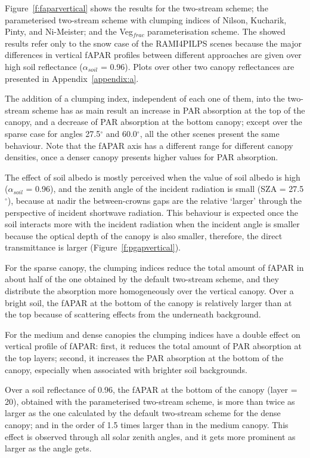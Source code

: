 Figure~\ref{f:faparvertical} shows the results for the two-stream scheme; the parameterised two-stream scheme with clumping indices of Nilson, Kucharik, Pinty, and Ni-Meister; and the Veg$_{frac}$ parameterisation scheme. The showed results refer only to the snow case of the RAMI4PILPS scenes because the major differences in vertical fAPAR profiles between different approaches are given over high soil reflectance ($\alpha_{soil}$ = 0.96). Plots over other two canopy reflectances are presented in Appendix~\ref{appendix:a}.

The addition of a clumping index, independent of each one of them, into the two-stream scheme has as main result an increase in PAR absorption at the top of the canopy, and a decrease of PAR absorption at the bottom canopy; except over the sparse case for angles 27.5$^{\circ}$ and 60.0$^{\circ}$, all the other scenes present the same behaviour. Note that the fAPAR axis has a different range for different canopy densities, once a denser canopy presents higher values for PAR absorption.

The effect of soil albedo is mostly perceived when the value of soil albedo is high ($\alpha_{soil}$ = 0.96), and the zenith angle of the incident radiation is small (SZA = 27.5$^{\circ}$), because at nadir the between-crowns gaps are the relative `larger' through the perspective of incident shortwave radiation. This behaviour is expected once the soil interacts more with the incident radiation when the incident angle is smaller because the optical depth of the canopy is also smaller, therefore, the direct transmittance is larger (Figure~\ref{f:pgapvertical}).

For the sparse canopy, the clumping indices reduce the total amount of fAPAR in about half of the one obtained by the default two-stream scheme, and they distribute the absorption more homogeneously over the vertical canopy. Over a bright soil, the fAPAR at the bottom of the canopy is relatively larger than at the top because of scattering effects from the underneath background.

For the medium and dense canopies the clumping indices have a double effect on vertical profile of fAPAR: first, it reduces the total amount of PAR absorption at the top layers; second, it increases the PAR absorption at the bottom of the canopy, especially when associated with brighter soil backgrounds.

Over a soil reflectance of 0.96, the fAPAR at the bottom of the canopy (layer = 20), obtained with the parameterised two-stream scheme, is more than twice as larger as the one calculated by the default two-stream scheme for the dense canopy; and in the order of 1.5 times larger than in the medium canopy. This effect is observed through all solar zenith angles, and it gets more prominent as larger as the angle gets. 

